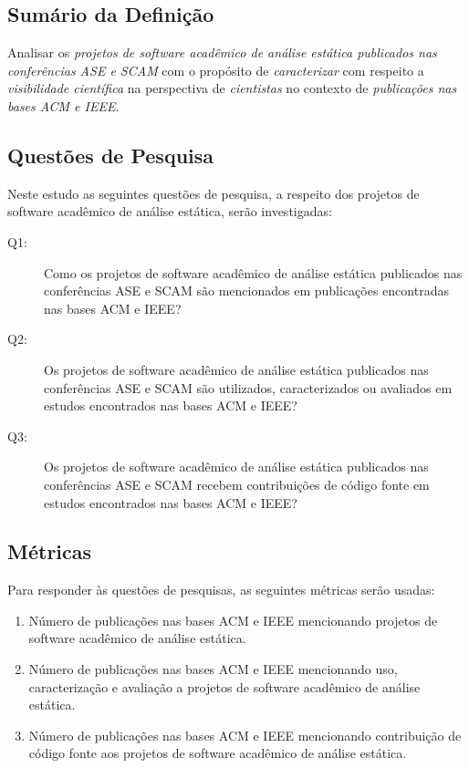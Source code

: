 \subsection{Sumário da Definição}

Analisar os \textit{projetos de software acadêmico de análise estática publicados nas conferências ASE e SCAM}
com o propósito de \textit{caracterizar}
com respeito a \textit{visibilidade científica}
na perspectiva de \textit{cientistas}
no contexto de \textit{publicações nas bases ACM e IEEE}.

\subsection{Questões de Pesquisa}

Neste estudo as seguintes questões de pesquisa, a respeito dos projetos de
software acadêmico de análise estática, serão investigadas:

\newcommand{\EstudoDoisQuestaoUm}{Como os projetos de software acadêmico de
análise estática publicados nas conferências ASE e SCAM são mencionados em
publicações encontradas nas bases ACM e IEEE?}

\newcommand{\EstudoDoisQuestaoDois}{Os projetos de software acadêmico de
análise estática publicados nas conferências ASE e SCAM são utilizados,
caracterizados ou avaliados em estudos encontrados nas bases ACM e IEEE?}

\newcommand{\EstudoDoisQuestaoTres}{Os projetos de software acadêmico de
análise estática publicados nas conferências ASE e SCAM recebem contribuições
de código fonte em estudos encontrados nas bases ACM e IEEE?}

\begin{description}
  \item [Q1:] \EstudoDoisQuestaoUm
  \item [Q2:] \EstudoDoisQuestaoDois
  \item [Q3:] \EstudoDoisQuestaoTres
\end{description}

\subsection{Métricas}

Para responder às questões de pesquisas, as seguintes métricas serão usadas:

\begin{enumerate}
  \item Número de publicações nas bases ACM e IEEE mencionando projetos de
    software acadêmico de análise estática.
  \item Número de publicações nas bases ACM e IEEE mencionando uso,
    caracterização e avaliação a projetos de software acadêmico de análise
    estática.
  \item Número de publicações nas bases ACM e IEEE mencionando contribuição de
    código fonte aos projetos de software acadêmico de análise estática.
\end{enumerate}

